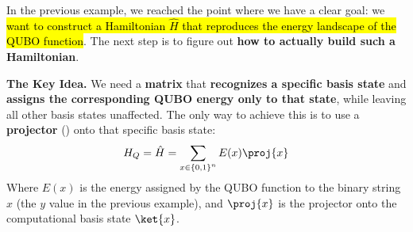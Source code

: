 \highspace
In the previous example, we reached the point where we have a clear goal: we \hl{want to construct a Hamiltonian $\hat{H}$ that reproduces the energy landscape of the QUBO function}. The next step is to figure out \textbf{how to actually build such a Hamiltonian}.

\highspace
\textcolor{Green3}{ \textbf{The Key Idea.}} We need a \textbf{matrix} that \textbf{recognizes a specific basis state} and \textbf{assigns the corresponding QUBO energy only to that state}, while leaving all other basis states unaffected. The only way to achieve this is to use a \textbf{projector} () onto that specific basis state:
\begin{equation}\label{eq:hamiltonian-projector}
    H_{Q} = \hat{H} = \sum_{x \in \left\{0, 1\right\}^{n}} E(x) \proj{x}
\end{equation}
Where $E(x)$ is the energy assigned by the QUBO function to the binary string $x$ (the $y$ value in the previous example), and $\proj{x}$ is the projector onto the computational basis state $\ket{x}$.

